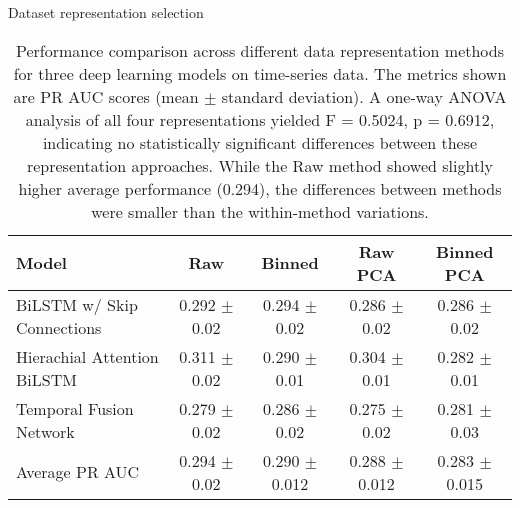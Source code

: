 \documentclass{article}
\begin{document}
\begin{table}[htbp]
    \centering
    \caption{Dataset representation selection}
    \begin{tabular}{l|cccc}
        \hline
        Model                       & Raw     & Binned  & Raw PCA & Binned PCA        \\
        \hline
        BiLSTM w/ Skip Connections  & 0.292 $\pm$ 0.02 & 0.294 $\pm$ 0.02 & 0.286 $\pm$ 0.02  & 0.286 $\pm$ 0.02 \\
        Hierachial Attention BiLSTM & 0.311 $\pm$ 0.02 & 0.290 $\pm$ 0.01 & 0.304 $\pm$ 0.01 & 0.282   $\pm$ 0.01        \\
        Temporal Fusion Network     & 0.279 $\pm$ 0.02 & 0.286 $\pm$ 0.02 & 0.275 $\pm$ 0.02 & 0.281 $\pm$ 0.03          \\
        \hline
        Average PR AUC              & 0.294 $\pm$ 0.02 & 0.290 $\pm$ 0.012 & 0.288 $\pm$ 0.012 & 0.283 $\pm$ 0.015          \\
        \hline
    \end{tabular}
    \caption*{
        Performance comparison across different data representation methods for three deep learning models on time-series data. 
        The metrics shown are PR AUC scores (mean $\pm$ standard deviation). 
        A one-way ANOVA analysis of all four representations yielded F = 0.5024, p = 0.6912, 
        indicating no statistically significant differences between these representation approaches. 
        While the Raw method showed slightly higher average performance (0.294), 
        the differences between methods were smaller than the within-method variations.
    }
    \label{tab:dataset-representation}
\end{table}
\end{document}
